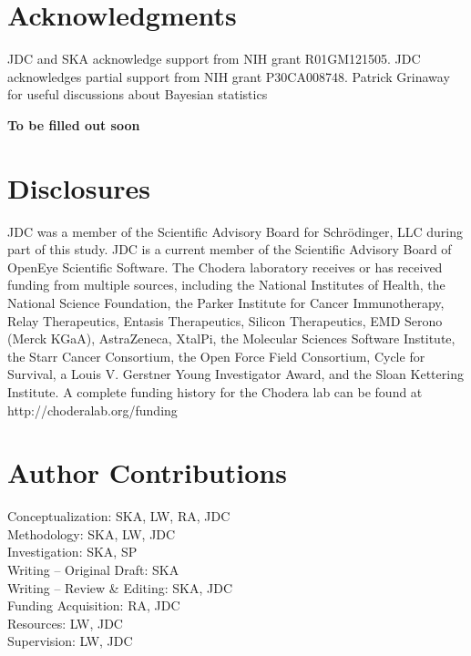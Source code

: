 \documentclass[9pt,lineno]{elife-modified} %
\begin{document}
%
\newpage
%




\section{Acknowledgments}
JDC and SKA acknowledge support from NIH grant R01GM121505.
JDC acknowledges partial support from NIH grant P30CA008748.
Patrick Grinaway for useful discussions about Bayesian statistics 

\textbf{To be filled out soon}


\section{Disclosures}

JDC was a member of the Scientific Advisory Board for Schrödinger, LLC during part of this study.
JDC is a current member of the Scientific Advisory Board of OpenEye Scientific Software.
The Chodera laboratory receives or has received funding from multiple sources, including the National Institutes of Health, the National Science Foundation, the Parker Institute for Cancer Immunotherapy, Relay Therapeutics, Entasis Therapeutics, Silicon Therapeutics, EMD Serono (Merck KGaA), AstraZeneca, XtalPi, the Molecular Sciences Software Institute, the Starr Cancer Consortium, the Open Force Field Consortium, Cycle for Survival, a Louis V. Gerstner Young Investigator Award, and the Sloan Kettering Institute.
A complete funding history for the Chodera lab can be found at http://choderalab.org/funding


\section{Author Contributions}
Conceptualization: SKA, LW, RA, JDC \\
Methodology: SKA, LW, JDC\\
Investigation: SKA, SP\\
Writing -- Original Draft: SKA\\
Writing -- Review \& Editing: SKA, JDC \\
Funding Acquisition: RA, JDC\\
Resources: LW, JDC\\
Supervision: LW, JDC
\end{document}
